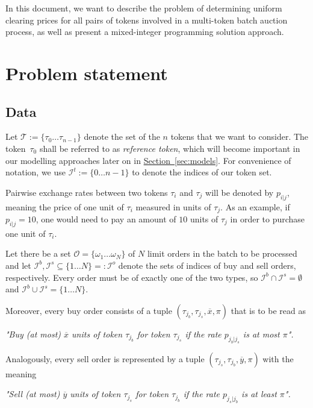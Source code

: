 \documentclass[11pt,parskip=full]{scrartcl}%
\newcommand*{\tokens}{\mathcal{T}}          %
\newcommand*{\orders}{\mathcal{O}}          %
\newcommand*{\iorders}{\mathcal{I}^o}       %
\newcommand*{\ibuyorders}{\mathcal{I}^b}    %
\newcommand*{\isellorders}{\mathcal{I}^s}   %
\newcommand*{\secref}[1]{\hyperref[{#1}]{Section~\ref*{#1}}}
\begin{document}
In this document, we want to describe the problem of determining uniform clearing prices for all
pairs of tokens involved in a multi-token batch auction process, as well as present a mixed-integer
programming solution approach.


\clearpage
\section{Problem statement}
\label{sec:problem}

\subsection{Data}
\label{subsec:data}

Let $ \tokens := \{ \tau_0 \ldots \tau_{n-1} \} $ denote the set of the $ n $ tokens that we want
to consider.
The token~$ \tau_0 $ shall be referred to as \emph{reference token}, which will become important in
our modelling approaches later on in \secref{sec:models}.
For convenience of notation, we use $ \mathcal{I}^t := \{ 0 \ldots n-1 \} $ to denote the indices
of our token set.

Pairwise exchange rates between two tokens $ \tau_i $ and $ \tau_j $ will be denoted by
$ p_{i|j} $, meaning the price of one unit of $ \tau_i $ measured in units of $ \tau_j $.
As an example, if $ p_{i|j} = 10 $, one would need to pay an amount of $ 10 $ units of $ \tau_j $
in order to purchase one unit of $ \tau_i $.

Let there be a set $ \orders = \{ \omega_1 \ldots \omega_N \} $ of $ N $ limit orders in the batch
to be processed and let $ \ibuyorders, \isellorders \subseteq \{ 1 \ldots N \} =: \iorders $ denote
the sets of indices of buy and sell orders, respectively.
Every order must be of exactly one of the two types, so $ \ibuyorders \cap \isellorders =
\emptyset $ and $ \ibuyorders \cup \isellorders = \{ 1 \ldots N \} $.

Moreover, every buy order consists of a tuple $ (\tau_{j_b},\tau_{j_s},\overline{x},\pi) $ that is
to be read as
\vspace{-.6cm}
\begin{center}
  \emph{
    "Buy (at most) $ \overline{x} $ units of token $ \tau_{j_b} $ for token $ \tau_{j_s} $
    if the rate $ p_{j_b|j_s} $ is at most $ \pi $".
  }
\end{center}
\vspace{-.4cm}
Analogously, every sell order is represented by a tuple
$ (\tau_{j_s},\tau_{j_b},\overline{y},\pi) $ with the meaning
\vspace{-.6cm}
\begin{center}
  \emph{
    "Sell (at most) $ \overline{y} $ units of token $ \tau_{j_s} $ for token $ \tau_{j_b} $
    if the rate $ p_{j_s|j_b} $ is at least $ \pi $".
  }
\end{center}
\vspace{-.3cm}
\end{document}

